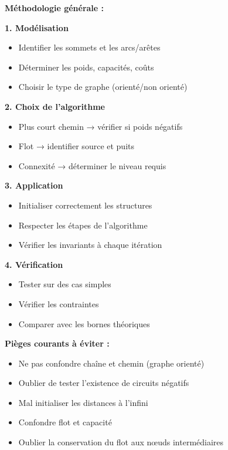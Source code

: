 \documentclass[12pt,a4paper]{article}
\begin{document}
\begin{notecours}
\textbf{Méthodologie générale :}

\textbf{1. Modélisation}
\begin{itemize}
    \item Identifier les sommets et les arcs/arêtes
    \item Déterminer les poids, capacités, coûts
    \item Choisir le type de graphe (orienté/non orienté)
\end{itemize}

\textbf{2. Choix de l'algorithme}
\begin{itemize}
    \item Plus court chemin → vérifier si poids négatifs
    \item Flot → identifier source et puits
    \item Connexité → déterminer le niveau requis
\end{itemize}

\textbf{3. Application}
\begin{itemize}
    \item Initialiser correctement les structures
    \item Respecter les étapes de l'algorithme
    \item Vérifier les invariants à chaque itération
\end{itemize}

\textbf{4. Vérification}
\begin{itemize}
    \item Tester sur des cas simples
    \item Vérifier les contraintes
    \item Comparer avec les bornes théoriques
\end{itemize}
\end{notecours}

\begin{important}
\textbf{Pièges courants à éviter :}
\begin{itemize}
    \item Ne pas confondre chaîne et chemin (graphe orienté)
    \item Oublier de tester l'existence de circuits négatifs
    \item Mal initialiser les distances à l'infini
    \item Confondre flot et capacité
    \item Oublier la conservation du flot aux nœuds intermédiaires
\end{itemize}
\end{important}
\end{document}
